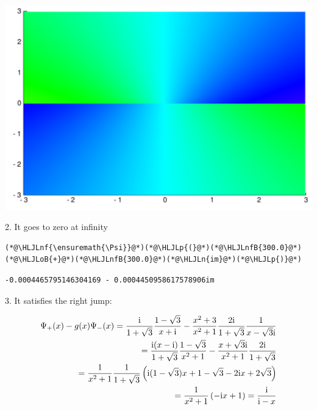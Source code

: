 \documentclass[12pt,a4paper]{article}
\newcommand{\HLJLn}[1]{#1}
\newcommand{\HLJLnf}[1]{\textcolor[RGB]{66,102,213}{#1}}
\newcommand{\HLJLnfB}[1]{\textcolor[RGB]{59,151,46}{#1}}
\newcommand{\HLJLoB}[1]{\textcolor[RGB]{102,102,102}{\textbf{#1}}}
\newcommand{\HLJLp}[1]{#1}
\def\I{ {\rm i} }
\begin{document}
\includegraphics[width=\linewidth]{figures/Lecture25_4_1.pdf}

2. It goes to zero at infinity


\begin{lstlisting}
(*@\HLJLnf{\ensuremath{\Psi}}@*)(*@\HLJLp{(}@*)(*@\HLJLnfB{300.0}@*)(*@\HLJLoB{+}@*)(*@\HLJLnfB{300.0}@*)(*@\HLJLn{im}@*)(*@\HLJLp{)}@*)
\end{lstlisting}

\begin{lstlisting}
-0.0004465795146304169 - 0.0004450958617578906im
\end{lstlisting}


3. It satisfies the right jump:


\begin{align*}
 \Psi_+(x) - g(x) \Psi_-(x) = {\I \over 1+\sqrt 3} {1-\sqrt 3 \over x+\I}  - {x^2 + 3 \over x^2 + 1} 
{2 \I  \over 1+ \sqrt{3}} {1 \over x-\sqrt{3}\I}  \\
 = {\I (x-\I) \over 1+\sqrt 3} {1-\sqrt 3 \over x^2+1}  - {x + \sqrt{3} \I \over x^2 + 1} 
{2 \I  \over 1+ \sqrt{3}}  \\
= {1\over x^2 + 1} 
{1 \over 1+ \sqrt{3}}  \left(\I(1-\sqrt 3) x+1-\sqrt{3}  - 2\I x + 2 \sqrt{3}    \right) \\
= {1\over x^2 + 1} 
 \left(-\I x+1    \right) = {\I \over \I - x}
\end{align*}
\end{document}
